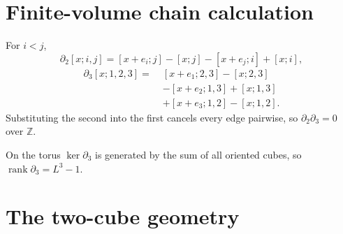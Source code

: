 \documentclass[11pt]{article}
\theoremstyle{plain}
\theoremstyle{definition}
\theoremstyle{remark}
\newcommand{\chk}[1]{}
\begin{document}
\section{Finite-volume chain calculation}\label{app:chain}

For $i<j$,
\[
  \partial_2[x;i,j]=[x+e_i;j]-[x;j]-[x+e_j;i]+[x;i],
\]
\begin{align*}
  \partial_3[x;1,2,3]=\;&[x+e_1;2,3]-[x;2,3]\\
  &-[x+e_2;1,3]+[x;1,3]\\
  &+[x+e_3;1,2]-[x;1,2].
\end{align*}
Substituting the second into the first cancels every edge pairwise, so
$\partial_2\partial_3=0$ over $\mathbb Z$.
\chk{d\_2 d\_3 = 0 on the built complex}
On the torus $\ker\partial_3$ is generated by the sum of all oriented cubes,
so $\operatorname{rank}\partial_3=L^3-1$.
\chk{rank d\_3 = L\^{}3 - 1 on the built complex}

\section{The two-cube geometry}\label{app:twocube}
\end{document}
